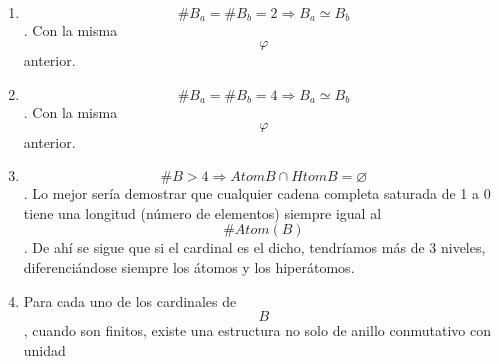 \begin{enumerate}
\begin{enumerate}
\begin{enumerate}
      \begin{enumerate}
      \def\labelenumiv{\arabic{enumiv}.}
      \tightlist
      \item
        \[\begin{matrix}
        {n{: = \#}\left( {\mathit{Atom}B} \right)} \\
        {{n \leq m}{: = \#}\left( B \right)} \\
        {\left\lbrack {1,n} \right\rbrack_{\mathbb{N}}{: = {\{{1,2,\ldots,n}\}}}} \\
        {\varphi:@{\left( {\mathit{Atom}\left( B \right)} \right)\rightarrow B}} \\
        {{\varphi{(x)}}{: =}\begin{Bmatrix}
        0 & \Leftarrow & {{x = \varnothing} = {\{\}}} \\
        {x_{1}'} & \Leftarrow & {x = {\{{x_{1}'}\}}} \\
        {{\sum\limits_{\substack{k \in I \\ I \subset {\lbrack{1,n}\rbrack}_{\mathbb{N}}}}x_{k}}'} & \Leftarrow & {x = {\{{{x_{i}'} \mid {{i \in I} \subset \left\lbrack {1,n} \right\rbrack_{\mathbb{N}}}}\}}} \\
        {x_{1}{{' + \ldots} + x_{i - 1}}{' + x_{i}}{{' + \ldots} + x_{n}}'} & \Leftarrow & {{x = \mathit{Atom}}{{(B)} \smallsetminus {\{{x_{i}'}\}}}} \\
        1 & \Leftarrow & {{x = \mathit{Atom}}{(B)}}
        \end{Bmatrix}}
        \end{matrix}\].
      \end{enumerate}
    \item
      \[\#{B_{a} = \#}{B_{b} = 2}\Rightarrow{B_{a} \simeq B_{b}}\]. Con
      la misma \[\varphi\] anterior.
    \item
      \[\#{B_{a} = \#}{B_{b} = 4}\Rightarrow{B_{a} \simeq B_{b}}\]. Con
      la misma \[\varphi\] anterior.
    \item
      \[\#{B > 4}\Rightarrow\mathit{Atom}{B \cap \mathit{Htom}}{B = \varnothing}\].
      Lo mejor sería demostrar que cualquier cadena completa saturada de
      1 a 0 tiene una longitud (número de elementos) siempre igual al
      \[\#\mathit{Atom}{(B)}\]. De ahí se sigue que si el cardinal es el
      dicho, tendríamos más de 3 niveles, diferenciándose siempre los
      átomos y los hiperátomos.
    \item
      Para cada uno de los cardinales de \[B\], cuando son finitos,
      existe una estructura no solo de anillo conmutativo con unidad

\end{enumerate}
\end{enumerate}
\end{enumerate}
